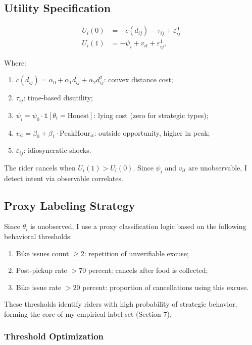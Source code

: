 \documentclass[12pt,letterpaper]{article}
\begin{document}
\subsection{Utility Specification}

\begin{align}
U_i(0) &= -c(d_{ij}) - \tau_{ij} + \varepsilon^0_{ij} \tag{1}\\
U_i(1) &= -\psi_i + v_{it} + \varepsilon^1_{ij}, \tag{2}
\end{align}

Where:
\begin{enumerate}
    \item $c(d_{ij}) = \alpha_0 + \alpha_1 d_{ij} + \alpha_2 d_{ij}^2$: convex distance cost;
    \item $\tau_{ij}$: time-based disutility;
    \item $\psi_i = \psi_0 \cdot \mathbb{1}[\theta_i = \text{Honest}]$: lying cost (zero for strategic types);
    \item $v_{it} = \beta_0 + \beta_1 \cdot \text{PeakHour}_{it}$: outside opportunity, higher in peak;
    \item $\varepsilon_{ij}$: idiosyncratic shocks.
\end{enumerate}

The rider cancels when $U_i(1) > U_i(0)$. Since $\psi_i$ and $v_{it}$ are unobservable, I detect intent via observable correlates.

\subsection{Proxy Labeling Strategy}

Since $\theta_i$ is unobserved, I use a proxy classification logic based on the following behavioral thresholds:
\begin{enumerate}
    \item Bike issues count $\geq 2$: repetition of unverifiable excuse;
    \item Post-pickup rate $> 70$ percent: cancels after food is collected;
    \item Bike issue rate $> 20$ percent: proportion of cancellations using this excuse.
\end{enumerate}

These thresholds identify riders with high probability of strategic behavior, forming the core of my empirical label set (Section 7).

\subsubsection{Threshold Optimization}
\end{document}
